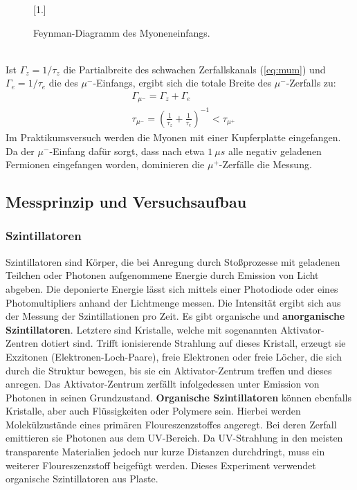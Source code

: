 		\begin{figure}[ht]
			\centering
			\scalebox{1.}[1.]{
			
			}
			\caption{Feynman-Diagramm des Myoneneinfangs.}
			\label{fig:myoneinfang}	
		\end{figure}
	\ \\
	Ist $\Gamma_z = 1/\tau_z$ die Partialbreite  des schwachen Zerfallskanals (\ref{eq:mum}) und $\Gamma_e=1/\tau_e$ die des $\mu^-$-Einfangs, ergibt sich die totale Breite des $\mu^-$-Zerfalls zu:
		\begin{align}
			&\Gamma_{\mu^-} = \Gamma_z + \Gamma_e\\
			&\tau_{\mu^-} = \left(\frac{1}{\tau_z} + \frac{1}{\tau_e}\right)^{-1} < \tau_{\mu^+}  
		\end{align}
	Im Praktikumsversuch werden die Myonen mit einer Kupferplatte eingefangen. Da der $\mu^-$-Einfang dafür sorgt, dass nach etwa $1\ \unit{\mu s}$ alle negativ geladenen Fermionen eingefangen worden, dominieren die $\mu^+$-Zerfälle die Messung. 
	
	\subsection{Messprinzip und Versuchsaufbau}
        \subsubsection{Szintillatoren}
            Szintillatoren sind Körper, die bei Anregung durch Stoßprozesse mit geladenen Teilchen oder Photonen aufgenommene Energie durch Emission von Licht abgeben. Die deponierte Energie lässt sich mittels einer Photodiode oder eines Photomultipliers anhand der Lichtmenge messen. Die Intensität ergibt sich aus der Messung der Szintillationen pro Zeit.
            Es gibt organische und \textbf{anorganische Szintillatoren}. Letztere sind Kristalle, welche mit sogenannten Aktivator-Zentren dotiert sind. Trifft ionisierende Strahlung auf dieses Kristall, erzeugt sie Exzitonen (Elektronen-Loch-Paare), freie Elektronen oder freie Löcher, die sich durch die Struktur bewegen, bis sie ein Aktivator-Zentrum treffen und dieses anregen. Das Aktivator-Zentrum zerfällt infolgedessen unter Emission von Photonen in seinen Grundzustand. 
            \textbf{Organische Szintillatoren} können ebenfalls Kristalle, aber auch Flüssigkeiten oder Polymere sein. Hierbei werden Molekülzustände eines primären Floureszenzstoffes angeregt. Bei deren Zerfall emittieren sie Photonen aus dem UV-Bereich. Da UV-Strahlung in den meisten transparente Materialien jedoch nur kurze Distanzen durchdringt, muss ein weiterer Floureszenzstoff beigefügt werden.
            Dieses Experiment verwendet organische Szintillatoren aus Plaste.
